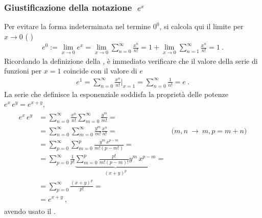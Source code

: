 \documentclass[letterpaper,10pt,italian]{jupyterBook}
\begin{document}
\subsubsection{Giustificazione della notazione \protect\(\ e^x\protect\)}
\label{\detokenize{ch/precalculus/exponential_logarithm-notes:giustificazione-della-notazione-e-x}}\label{\detokenize{ch/precalculus/exponential_logarithm-notes:math-hs-exp-log-notes-powers}}
\sphinxAtStartPar
Per evitare la forma indeterminata nel termine \(0^0\), si calcola qui il limite per \(x \rightarrow 0\) ( )
\begin{equation*}
\begin{split}e^0 := \lim_{x \rightarrow 0} e^x = \lim_{x \rightarrow 0} \sum_{n = 0}^{\infty} \frac{x^n}{n!} = 1 + \lim_{x \rightarrow 0} \sum_{n=1}^{\infty} \frac{x^n}{n!} = 1 \ .\end{split}
\end{equation*}
\sphinxAtStartPar
Ricordando la definizione della {\hyperref[\detokenize{ch/series:math-hs-series-e-euler}]{}}, è immediato verificare che il valore della serie di funzioni per \(x = 1\) coincide con il valore di \(e\)
\begin{equation*}
\begin{split}e^1 = \sum_{n=0}^{\infty} \frac{x^n}{n!} \bigg|_{x=1} = \sum_{n=0}^{\infty} \frac{1}{n!} = e \ .\end{split}
\end{equation*}
\sphinxAtStartPar
La serie che definisce la esponenziale soddisfa la proprietà delle potenze \(e^x \, e^y = e^{x+y}\),
\begin{equation*}
\begin{split}\begin{aligned}
  e^x \, e^y 
  & = \sum_{n=0}^{\infty} \frac{x^n}{n!} \sum_{m = 0}^{\infty} \frac{y^m}{m!} = \\
  & = \sum_{n=0}^{\infty} \sum_{m=0}^{\infty} \frac{y^m}{m!} \frac{x^n}{n!} =  & \text{($m,n \  \rightarrow \ m,p=m+n$)}\\
  & = \sum_{p=0}^{\infty} \sum_{m=0}^{p} \frac{y^m \, x^{p-m}}{m! (p-m!)} = \\
  & = \sum_{p=0}^{\infty} \frac{1}{p!} \underbrace{\sum_{m=0}^{p} \frac{p!}{m! (p-m)!} y^m \, x^{p-m}}_{(x+y)^p} = \\
  & = \sum_{p=0}^{\infty} \frac{(x+y)^p}{p!} = \\
  & = e^{x+y} \ ,
\end{aligned}\end{split}
\end{equation*}
\sphinxAtStartPar
avendo usato il {\hyperref[\detokenize{ch/precalculus/polynomials:math-hs-precalculus-polynomials-binomial-thm}]{}}.
\end{document}
